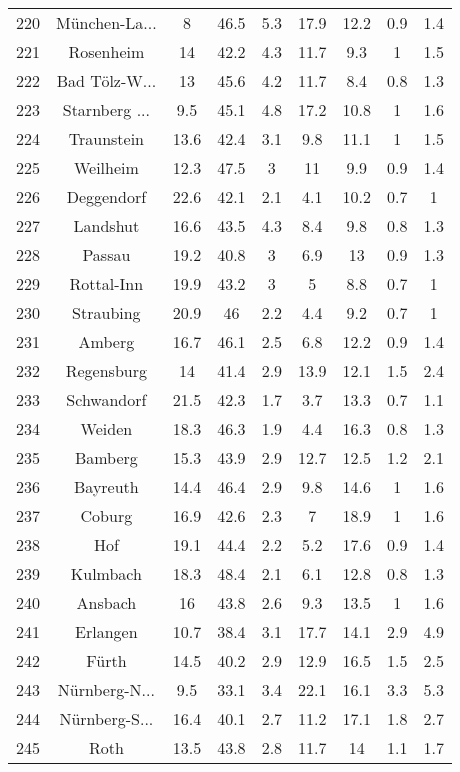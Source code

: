 \begin{table}[!htbp]
\begin{tabular}{@{\extracolsep{5pt}} ccccccccc}
220 & München-La... & 8 & 46.5 & 5.3 & 17.9 & 12.2 & 0.9 & 1.4 \\ 
221 & Rosenheim & 14 & 42.2 & 4.3 & 11.7 & 9.3 & 1 & 1.5 \\ 
222 & Bad Tölz-W... & 13 & 45.6 & 4.2 & 11.7 & 8.4 & 0.8 & 1.3 \\ 
223 & Starnberg ... & 9.5 & 45.1 & 4.8 & 17.2 & 10.8 & 1 & 1.6 \\ 
224 & Traunstein & 13.6 & 42.4 & 3.1 & 9.8 & 11.1 & 1 & 1.5 \\ 
225 & Weilheim & 12.3 & 47.5 & 3 & 11 & 9.9 & 0.9 & 1.4 \\ 
226 & Deggendorf & 22.6 & 42.1 & 2.1 & 4.1 & 10.2 & 0.7 & 1 \\ 
227 & Landshut & 16.6 & 43.5 & 4.3 & 8.4 & 9.8 & 0.8 & 1.3 \\ 
228 & Passau & 19.2 & 40.8 & 3 & 6.9 & 13 & 0.9 & 1.3 \\ 
229 & Rottal-Inn & 19.9 & 43.2 & 3 & 5 & 8.8 & 0.7 & 1 \\ 
230 & Straubing & 20.9 & 46 & 2.2 & 4.4 & 9.2 & 0.7 & 1 \\ 
231 & Amberg & 16.7 & 46.1 & 2.5 & 6.8 & 12.2 & 0.9 & 1.4 \\ 
232 & Regensburg & 14 & 41.4 & 2.9 & 13.9 & 12.1 & 1.5 & 2.4 \\ 
233 & Schwandorf & 21.5 & 42.3 & 1.7 & 3.7 & 13.3 & 0.7 & 1.1 \\ 
234 & Weiden & 18.3 & 46.3 & 1.9 & 4.4 & 16.3 & 0.8 & 1.3 \\ 
235 & Bamberg & 15.3 & 43.9 & 2.9 & 12.7 & 12.5 & 1.2 & 2.1 \\ 
236 & Bayreuth & 14.4 & 46.4 & 2.9 & 9.8 & 14.6 & 1 & 1.6 \\ 
237 & Coburg & 16.9 & 42.6 & 2.3 & 7 & 18.9 & 1 & 1.6 \\ 
238 & Hof & 19.1 & 44.4 & 2.2 & 5.2 & 17.6 & 0.9 & 1.4 \\ 
239 & Kulmbach & 18.3 & 48.4 & 2.1 & 6.1 & 12.8 & 0.8 & 1.3 \\ 
240 & Ansbach & 16 & 43.8 & 2.6 & 9.3 & 13.5 & 1 & 1.6 \\ 
241 & Erlangen & 10.7 & 38.4 & 3.1 & 17.7 & 14.1 & 2.9 & 4.9 \\ 
242 & Fürth & 14.5 & 40.2 & 2.9 & 12.9 & 16.5 & 1.5 & 2.5 \\ 
243 & Nürnberg-N... & 9.5 & 33.1 & 3.4 & 22.1 & 16.1 & 3.3 & 5.3 \\ 
244 & Nürnberg-S... & 16.4 & 40.1 & 2.7 & 11.2 & 17.1 & 1.8 & 2.7 \\ 
245 & Roth & 13.5 & 43.8 & 2.8 & 11.7 & 14 & 1.1 & 1.7 \\ 

\end{tabular}
\end{table}
